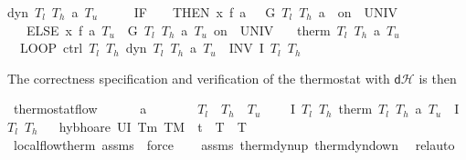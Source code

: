 \documentclass[envcountsame,envcountsect]{llncs}
\newcommand{\dH}{\mathsf{d}\mathcal{H}}
\begin{document}
\begin{example}
\begin{isabellebody}
{\isachardoublequoteopen}dyn\ $T_l$\ $T_h$\ a\ $T_u$\ {\isasymtau}\ {\isasymequiv}\ \isanewline
\ \ IF\ {\isacharparenleft}{\isasymtheta}\ {\isacharequal}\ {}{\isacharparenright}\ THEN\ x{\isasymacute}{\isacharequal}\ f\ a\ {}\ {\isacharampersand}\ G\ $T_l$\ $T_h$\ a\ {}\ on\ {\isacharbraceleft}{}{\isachardot}{\isachardot}{\isasymtau}{\isacharbraceright}\ UNIV\ {\isacharat}\ {}\ \isanewline
\ \ \ ELSE\ x{\isasymacute}{\isacharequal}\ f\ a\ $T_u$\ {\isacharampersand}\ G\ $T_l$\ $T_h$\ a\ $T_u$\ on\ {\isacharbraceleft}{}{\isachardot}{\isachardot}{\isasymtau}{\isacharbraceright}\ UNIV\ {\isacharat}\ {}{\isachardoublequoteclose}\isanewline
\isanewline
{}\ {\isachardoublequoteopen}therm\ $T_l$\ $T_h$\ a\ $T_u$\ {\isasymtau}\ {\isasymequiv}\isanewline 
\ \ LOOP\ {\isacharparenleft}ctrl\ $T_l$\ $T_h${\isacharsemicolon}\ dyn\ $T_l$\ $T_h$\ a\ $T_u$\ {\isasymtau}{\isacharparenright}\ INV\ {\isacharparenleft}I\ $T_l$\ $T_h${\isacharparenright}{\isachardoublequoteclose}\isanewline
\end{isabellebody}

\noindent The correctness specification and verification of the
thermostat with $\dH$  is then
\begin{isabellebody}
\isanewline
{}\isamarkupfalse%
\ thermostat{\isacharunderscore}flow{\isacharcolon}\ \isanewline
\ \ \ {\isachardoublequoteopen}{}\ {\isacharless}\ a{\isachardoublequoteclose}\ \ {\isachardoublequoteopen}{}\ {\isasymle}\ {\isasymtau}{\isachardoublequoteclose}\ \ {\isachardoublequoteopen}{}\ {\isacharless}\ $T_l${\isachardoublequoteclose}\ \ {\isachardoublequoteopen}$T_h$\ {\isacharless}\ $T_u${\isachardoublequoteclose}\isanewline
\ \ \ {\isachardoublequoteopen}\ \isactrlbold {\isacharbraceleft}I\ $T_l$\ $T_h$\isactrlbold {\isacharbraceright}\ therm\ $T_l$\ $T_h$\ a\ $T_u$\ {\isasymtau}\ \isactrlbold {\isacharbraceleft}I\ $T_l$\ $T_h$\isactrlbold {\isacharbraceright}{\isachardoublequoteclose}\isanewline
\ \ \isamarkupfalse%
{\isacharparenleft}hyb{\isacharunderscore}hoare\ {\isachardoublequoteopen}U{\isacharparenleft}I\ T\isactrlsub m\ T\isactrlsub M\ {\isasymand}\ t{\isacharequal}{}\ {\isasymand}\ T\ {\isacharequal}\ T{\isacharparenright}{\isachardoublequoteclose}{\isacharparenright}\isanewline
\ \ \isamarkupfalse%
\ {}\ \isamarkupfalse%
\ {}\ \isamarkupfalse%
\ local{\isacharunderscore}flow{\isacharunderscore}therm\ assms\ \isamarkupfalse\ force{\isacharplus}\isanewline
\ \ \isamarkupfalse%
\ assms\ therm{\isacharunderscore}dyn{\isacharunderscore}up\ therm{\isacharunderscore}dyn{\isacharunderscore}down\ \isamarkupfalse%
\ rel{\isacharunderscore}auto{\isacharprime}\isanewline
\end{isabellebody}


\end{example}
\end{document}
